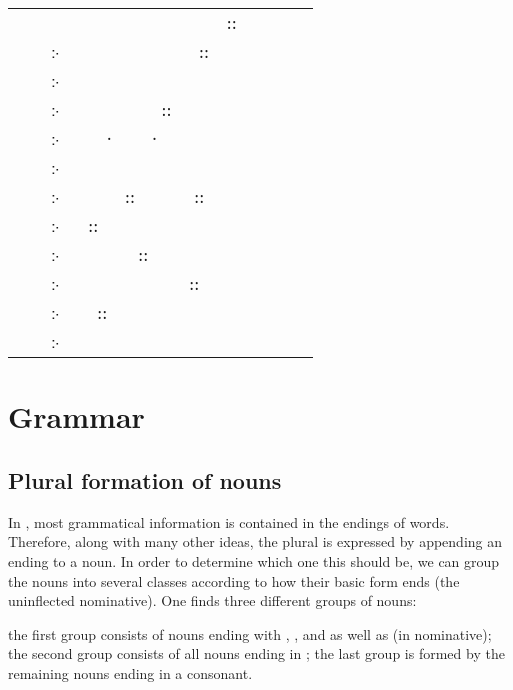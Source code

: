 \section{}
\begin{elvish}
\begin{tabularx}{\textwidth}{r@{ }X}
       &      ⸬   \\
჻ &     ⸬ \\
჻   &   \\
჻ &   ⸬ \\
჻   &  ⸱ ⸱    \\
჻  &   \\
჻ &  ⸬  ⸬    \\
჻  & ⸬ \\
჻ &  ⸬ \\
჻  &    ⸬ \\
჻ & ⸬  \\
჻  & 
\end{tabularx}
\end{elvish}

\section{Grammar}
\subsection{Plural formation of nouns}
In \quenya, most grammatical information is contained in the endings of words.
Therefore, along with many other ideas, the plural is expressed by appending an
ending to a noun. In order to determine which one this should be, we can group
the nouns into several classes according to how their basic form ends (the
uninflected nominative). One finds three different groups of nouns:

the first group consists of nouns ending with , ,  and
 as well as  (in nominative); the second group consists of all
nouns ending in ; the last group is formed by the remaining nouns ending
in a consonant.

